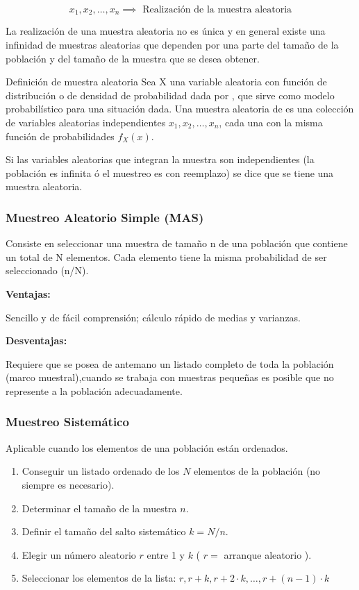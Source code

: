 \begin{equation*}
    x_1,x_2,\dots ,x_n\implies \text{ Realización de la muestra aleatoria}
\end{equation*}


La realización de una muestra aleatoria no es
única y en general existe una infinidad de
muestras aleatorias que dependen por una
parte del tamaño de la población y del
tamaño de la muestra que se desea obtener.

\begin{definition}
    Definición de muestra aleatoria
    Sea X una variable aleatoria con función de distribución
    o de densidad de probabilidad dada por , que sirve
    como modelo probabilístico para una situación dada.
    Una muestra aleatoria de es una colección de
    variables aleatorias independientes $x_1,x_2,\dots,x_n$, cada
    una con la misma función de probabilidades $f_X( x )$.
\end{definition}


Si las variables aleatorias que integran la muestra son
independientes (la población es infinita ó el muestreo es
con reemplazo) se dice que se tiene una muestra
aleatoria.

\subsubsection{Muestreo Aleatorio Simple (MAS)}

Consiste en seleccionar una muestra de tamaño n de una
población que contiene un total de N elementos. Cada
elemento tiene la misma probabilidad de ser seleccionado
(n/N).

\textbf{Ventajas:}

Sencillo y de fácil comprensión; cálculo rápido de medias y varianzas.

\textbf{Desventajas:}

Requiere que se posea de antemano un listado completo de
toda la población (marco muestral),cuando se trabaja con muestras pequeñas es posible que no represente a la población adecuadamente.

\subsubsection{Muestreo Sistemático}

Aplicable cuando los elementos de una población están
ordenados.

\begin{enumerate}
    \item Conseguir un listado ordenado de los $N$ elementos de la población (no siempre es necesario).
    \item Determinar el tamaño de la muestra $n$.
    \item Definir el tamaño del salto sistemático $k = N/n$.
    \item Elegir un número aleatorio $r$ entre 1 y $k$ ( $r =$ arranque aleatorio ).
    \item Seleccionar los elementos de la lista: $r, r+k, r+2\cdot k,\dots,r+(n-1)\cdot k$
\end{enumerate}

